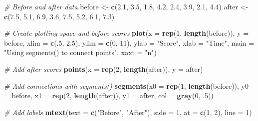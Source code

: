 \documentclass[]{book}
\newenvironment{Shaded}{\begin{snugshade}}{\end{snugshade}}
\newcommand{\KeywordTok}[1]{\textcolor[rgb]{0.13,0.29,0.53}{\textbf{#1}}}
\newcommand{\DataTypeTok}[1]{\textcolor[rgb]{0.13,0.29,0.53}{#1}}
\newcommand{\DecValTok}[1]{\textcolor[rgb]{0.00,0.00,0.81}{#1}}
\newcommand{\FloatTok}[1]{\textcolor[rgb]{0.00,0.00,0.81}{#1}}
\newcommand{\StringTok}[1]{\textcolor[rgb]{0.31,0.60,0.02}{#1}}
\newcommand{\CommentTok}[1]{\textcolor[rgb]{0.56,0.35,0.01}{\textit{#1}}}
\newcommand{\NormalTok}[1]{#1}
\theoremstyle{definition}
\theoremstyle{definition}
\theoremstyle{remark}
\begin{document}
\begin{Shaded}
\begin{Highlighting}[]
\CommentTok{# Before and after data}
\NormalTok{before <-}\StringTok{ }\KeywordTok{c}\NormalTok{(}\FloatTok{2.1}\NormalTok{, }\FloatTok{3.5}\NormalTok{, }\FloatTok{1.8}\NormalTok{, }\FloatTok{4.2}\NormalTok{, }\FloatTok{2.4}\NormalTok{, }\FloatTok{3.9}\NormalTok{, }\FloatTok{2.1}\NormalTok{, }\FloatTok{4.4}\NormalTok{)}
\NormalTok{after <-}\StringTok{ }\KeywordTok{c}\NormalTok{(}\FloatTok{7.5}\NormalTok{, }\FloatTok{5.1}\NormalTok{, }\FloatTok{6.9}\NormalTok{, }\FloatTok{3.6}\NormalTok{, }\FloatTok{7.5}\NormalTok{, }\FloatTok{5.2}\NormalTok{, }\FloatTok{6.1}\NormalTok{, }\FloatTok{7.3}\NormalTok{)}

\CommentTok{# Create plotting space and before scores}
\KeywordTok{plot}\NormalTok{(}\DataTypeTok{x =} \KeywordTok{rep}\NormalTok{(}\DecValTok{1}\NormalTok{, }\KeywordTok{length}\NormalTok{(before)), }
     \DataTypeTok{y =}\NormalTok{ before, }
     \DataTypeTok{xlim =} \KeywordTok{c}\NormalTok{(.}\DecValTok{5}\NormalTok{, }\FloatTok{2.5}\NormalTok{), }
     \DataTypeTok{ylim =} \KeywordTok{c}\NormalTok{(}\DecValTok{0}\NormalTok{, }\DecValTok{11}\NormalTok{),}
     \DataTypeTok{ylab =} \StringTok{"Score"}\NormalTok{, }
     \DataTypeTok{xlab =} \StringTok{"Time"}\NormalTok{,}
     \DataTypeTok{main =} \StringTok{"Using segments() to connect points"}\NormalTok{, }
     \DataTypeTok{xaxt =} \StringTok{"n"}\NormalTok{)}

\CommentTok{# Add after scores}
\KeywordTok{points}\NormalTok{(}\DataTypeTok{x =} \KeywordTok{rep}\NormalTok{(}\DecValTok{2}\NormalTok{, }\KeywordTok{length}\NormalTok{(after)), }\DataTypeTok{y =}\NormalTok{ after)}

\CommentTok{# Add connections with segments()}
\KeywordTok{segments}\NormalTok{(}\DataTypeTok{x0 =} \KeywordTok{rep}\NormalTok{(}\DecValTok{1}\NormalTok{, }\KeywordTok{length}\NormalTok{(before)), }
         \DataTypeTok{y0 =}\NormalTok{ before, }
         \DataTypeTok{x1 =} \KeywordTok{rep}\NormalTok{(}\DecValTok{2}\NormalTok{, }\KeywordTok{length}\NormalTok{(after)), }
         \DataTypeTok{y1 =}\NormalTok{ after, }
         \DataTypeTok{col =} \KeywordTok{gray}\NormalTok{(}\DecValTok{0}\NormalTok{, .}\DecValTok{5}\NormalTok{))}

\CommentTok{# Add labels}
\KeywordTok{mtext}\NormalTok{(}\DataTypeTok{text =} \KeywordTok{c}\NormalTok{(}\StringTok{"Before"}\NormalTok{, }\StringTok{"After"}\NormalTok{), }
      \DataTypeTok{side =} \DecValTok{1}\NormalTok{, }\DataTypeTok{at =} \KeywordTok{c}\NormalTok{(}\DecValTok{1}\NormalTok{, }\DecValTok{2}\NormalTok{), }\DataTypeTok{line =} \DecValTok{1}\NormalTok{)}
\end{Highlighting}
\end{Shaded}
\end{document}

